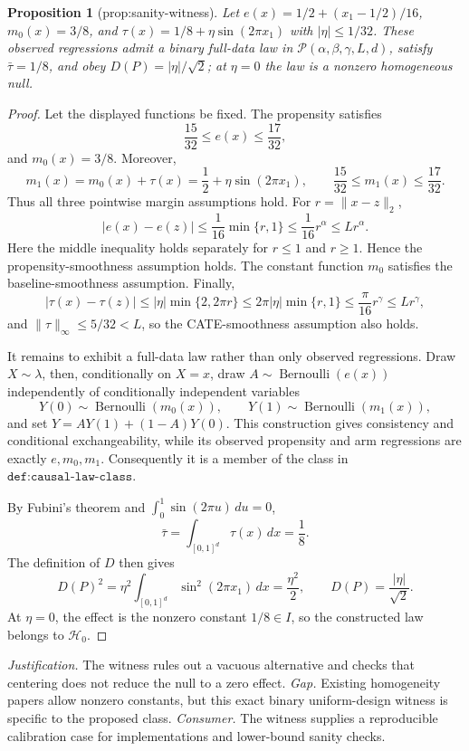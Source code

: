 \documentclass{article}
\newtheorem{proposition}{Proposition}
\begin{document}
\begin{proposition}[prop:sanity-witness]\label{prop:sanity-witness}
Let \(e(x)=1/2+(x_1-1/2)/16\), \(m_0(x)=3/8\), and \(\tau(x)=1/8+\eta\sin(2\pi x_1)\) with \(|\eta|\le1/32\). These observed regressions admit a binary full-data law in \(\mathcal P(\alpha,\beta,\gamma,L,d)\), satisfy \(\bar\tau=1/8\), and obey \(D(P)=|\eta|/\sqrt 2\); at \(\eta=0\) the law is a nonzero homogeneous null.
\end{proposition}
\begin{proof}
Let the displayed functions be fixed. The propensity satisfies
\[
  \frac{15}{32}\le e(x)\le\frac{17}{32},
\]
and \(m_0(x)=3/8\). Moreover,
\[
  m_1(x)=m_0(x)+\tau(x)=\frac12+\eta\sin(2\pi x_1),
  \qquad
  \frac{15}{32}\le m_1(x)\le\frac{17}{32}.
\]
Thus all three pointwise margin assumptions hold. For \(r=\lVert x-z\rVert_2\),
\[
 |e(x)-e(z)|\le \frac1{16}\min\{r,1\}\le \frac1{16}r^\alpha\le Lr^\alpha.
\]
Here the middle inequality holds separately for \(r\le1\) and \(r\ge1\). Hence the propensity-smoothness assumption holds. The constant function \(m_0\) satisfies the baseline-smoothness assumption. Finally,
\[
 |\tau(x)-\tau(z)|
 \le |\eta|\min\{2,2\pi r\}
 \le 2\pi|\eta|\min\{r,1\}
 \le \frac{\pi}{16}r^\gamma
 \le Lr^\gamma,
\]
and \(\lVert\tau\rVert_\infty\le5/32<L\), so the CATE-smoothness assumption also holds.

It remains to exhibit a full-data law rather than only observed regressions. Draw \(X\sim\lambda\), then, conditionally on \(X=x\), draw \(A\sim\operatorname{Bernoulli}(e(x))\) independently of conditionally independent variables
\[
 Y(0)\sim\operatorname{Bernoulli}(m_0(x)),
 \qquad
 Y(1)\sim\operatorname{Bernoulli}(m_1(x)),
\]
and set \(Y=AY(1)+(1-A)Y(0)\). This construction gives consistency and conditional exchangeability, while its observed propensity and arm regressions are exactly \(e,m_0,m_1\). Consequently it is a member of the class in \(\texttt{def:causal-law-class}\).

By Fubini's theorem and \(\int_0^1\sin(2\pi u)\,du=0\),
\[
 \bar\tau=\int_{[0,1]^d}\tau(x)\,dx=\frac18.
\]
The definition of \(D\) then gives
\[
 D(P)^2
 =\eta^2\int_{[0,1]^d}\sin^2(2\pi x_1)\,dx
 =\frac{\eta^2}{2},
 \qquad
 D(P)=\frac{|\eta|}{\sqrt2}.
\]
At \(\eta=0\), the effect is the nonzero constant \(1/8\in I\), so the constructed law belongs to \(\mathcal H_0\).
\end{proof}
\par\smallskip\noindent \textit{Justification.} The witness rules out a vacuous alternative and checks that centering does not reduce the null to a zero effect. \textit{Gap.} Existing homogeneity papers allow nonzero constants, but this exact binary uniform-design witness is specific to the proposed class. \textit{Consumer.} The witness supplies a reproducible calibration case for implementations and lower-bound sanity checks.
\end{document}
